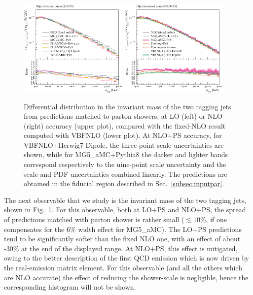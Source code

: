 \documentclass[twocolumn,epjc3]{svjour3} %
\newlength{\width}
\begin{document}
\begin{figure}[hbt]
\centering
\includegraphics[width=0.47\textwidth]{figures/LOPS/m_jj.pdf}
\includegraphics[width=0.47\textwidth]{figures/NLOPS/m_jj.pdf}
\caption{Differential distribution in the
invariant mass of the two tagging jets
from predictions matched to parton showers, at LO (left) or NLO (right) accuracy (upper plot), compared with the fixed-NLO result computed with {\sc VBFNLO} (lower plot). At NLO+PS accuracy, for
    {\sc VBFNLO}+{\sc Herwig7-Dipole}, the three-point scale uncertainties are shown, while for {\sc MG5\_aMC}+{\sc Pythia8} the darker and lighter bands correspond
    respectively to the nine-point scale uncertainty and the scale and PDF uncertainties combined linearly.
    The predictions are obtained in the fiducial region described in Sec.~\protect\ref{subsec:inputpar}.}
\label{fig:PSmjj}
\end{figure}

The next observable that we study is the invariant mass of the two tagging jets, shown in Fig.~\ref{fig:PSmjj}. For this observable, both at LO+PS and NLO+PS,
the spread of predictions matched with parton shower is rather small
($\lesssim 10\%$, if one compensates for the $6\%$ width effect for {\sc MG5\_aMC}).
The LO+PS predictions tend to be significantly softer than the fixed NLO one, with an effect of
about -30\% at the end of the displayed range. At NLO+PS, this effect is mitigated, owing to the better description of the first QCD emission which is now driven by the real-emission matrix element. For this observable (and all the others which are NLO accurate) the effect of reducing the shower-scale is 
negligible, hence the corresponding histogram will not be shown.
\end{document}
